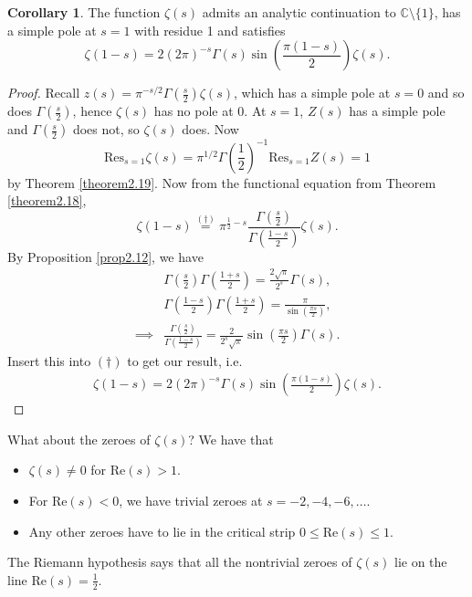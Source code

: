 \documentclass{article}
\theoremstyle{definition}
\newtheorem{cor}[theorem]{Corollary}
\begin{document}
\begin{cor}\label{cor2.20}
    The function $\zeta(s)$ admits an analytic continuation to $\mathbb{C} \setminus \{1\}$, has a simple pole at $s=1$ with residue 1 and satisfies $$\zeta(1-s) = 2 (2\pi)^{-s}\Gamma(s) \sin \left(\frac{\pi(1-s)}{2}\right) \zeta(s).$$
\end{cor}
\begin{proof}
    Recall $z(s) = \pi^{-s/2}\Gamma \left(\frac{s}{2}\right)\zeta(s)$, which has a simple pole at $s=0$ and so does $\Gamma \left(\frac{s}{2}\right)$, hence $\zeta(s)$ has no pole at 0. At $s=1$, $Z(s)$ has a simple pole and $\Gamma \left(\frac{s}{2}\right)$ does not, so $\zeta(s)$ does. Now $$\text{Res}_{s=1}\zeta(s) = \pi^{1/2}\Gamma \left(\frac{1}{2}\right)^{-1} \text{Res}_{s=1}Z(s) = 1$$ by Theorem \ref{theorem2.19}. Now from the functional equation from Theorem \ref{theorem2.18}, \[
    \zeta(1-s) \stackrel{(\dagger)}{=} \pi^{\frac{1}{2}-s}\frac{\Gamma \left(\frac{s}{2}\right)}{\Gamma \left(\frac{1-s}{2}\right)} \zeta(s).
    \]
    By Proposition \ref{prop2.12}, we have \begin{align*}
        &\Gamma \left(\frac{s}{2}\right) \Gamma \left(\frac{1+s}{2}\right) = \frac{2\sqrt{\pi}}{2^s}\Gamma(s),\\
        &\Gamma \left(\frac{1-s}{2}\right) \Gamma \left(\frac{1+s}{2}\right) = \frac{\pi}{\sin \left(\frac{\pi s}{2}\right)},\\
        \implies & \frac{\Gamma \left(\frac{s}{2}\right)}{\Gamma \left(\frac{1-s}{2}\right)} = \frac{2}{2^s \sqrt{\pi}}\sin \left(\frac{\pi s}{2}\right) \Gamma(s).
    \end{align*}
    Insert this into $(\dagger)$ to get our result, i.e. 
    \begin{align*}
        \zeta(1-s) = 2 (2\pi)^{-s}\Gamma(s) \sin \left(\frac{\pi (1-s)}{2}\right) \zeta(s).
    \end{align*}
\end{proof}
What about the zeroes of $\zeta(s)$? We have that 
\begin{itemize}
    \item $\zeta(s) \neq 0$ for $\text{Re}(s)>1$.
    \item For $\text{Re}(s)<0$, we have trivial zeroes at $s=-2,-4,-6,\ldots$.
    \item Any other zeroes have to lie in the critical strip $0\le \text{Re}(s)\le 1$.
\end{itemize}
The Riemann hypothesis says that all the nontrivial zeroes of $\zeta(s)$ lie on the line $\text{Re}(s) = \frac{1}{2}$.
\end{document}
